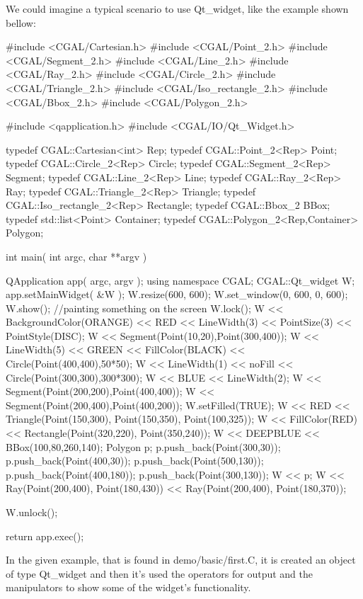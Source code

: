 \ccExample
We could imagine a typical scenario to use Qt\_widget, like the example shown 
bellow:
\begin{ccExampleCode}
#include <CGAL/Cartesian.h>
#include <CGAL/Point_2.h>
#include <CGAL/Segment_2.h>
#include <CGAL/Line_2.h>
#include <CGAL/Ray_2.h>
#include <CGAL/Circle_2.h>
#include <CGAL/Triangle_2.h>
#include <CGAL/Iso_rectangle_2.h>
#include <CGAL/Bbox_2.h>
#include <CGAL/Polygon_2.h>

#include <qapplication.h>
#include <CGAL/IO/Qt_Widget.h>

typedef CGAL::Cartesian<int> Rep;
typedef CGAL::Point_2<Rep> Point;
typedef CGAL::Circle_2<Rep> Circle;
typedef CGAL::Segment_2<Rep> Segment;
typedef CGAL::Line_2<Rep> Line;
typedef CGAL::Ray_2<Rep> Ray;
typedef CGAL::Triangle_2<Rep> Triangle;
typedef CGAL::Iso_rectangle_2<Rep> Rectangle;
typedef CGAL::Bbox_2 BBox;
typedef std::list<Point> Container;
typedef CGAL::Polygon_2<Rep,Container> Polygon;

int main( int argc, char **argv )
{
    QApplication app( argc, argv );
    using namespace CGAL;
    CGAL::Qt_widget W;
    app.setMainWidget( &W );
    W.resize(600, 600);
    W.set_window(0, 600, 0, 600);
    W.show();
    //painting something on the screen
    W.lock();
    W << BackgroundColor(ORANGE) << RED <<
	  LineWidth(3) << PointSize(3) << PointStyle(DISC);
    W << Segment(Point(10,20),Point(300,400));
    W << LineWidth(5) << GREEN << FillColor(BLACK) <<
      Circle(Point(400,400),50*50);
    W << LineWidth(1) << noFill << Circle(Point(300,300),300*300);
    W << BLUE << LineWidth(2);
    W << Segment(Point(200,200),Point(400,400));
    W << Segment(Point(200,400),Point(400,200));
    W.setFilled(TRUE);
    W << RED << Triangle(Point(150,300),
				   Point(150,350),
				   Point(100,325));
    W << FillColor(RED) << Rectangle(Point(320,220),
					       Point(350,240));
    W << DEEPBLUE << BBox(100,80,260,140);
    Polygon p;
    p.push_back(Point(300,30));
    p.push_back(Point(400,30));
    p.push_back(Point(500,130));
    p.push_back(Point(400,180));
    p.push_back(Point(300,130));
    W << p;
    W << Ray(Point(200,400), Point(180,430))
      << Ray(Point(200,400), Point(180,370));
    
    W.unlock();

    return app.exec();
}
\end{ccExampleCode}

In the given example, that is found in demo/basic/first.C, it is created an 
object of type Qt\_widget and then it's used the operators for output and the
manipulators to show some of the widget's functionality.








